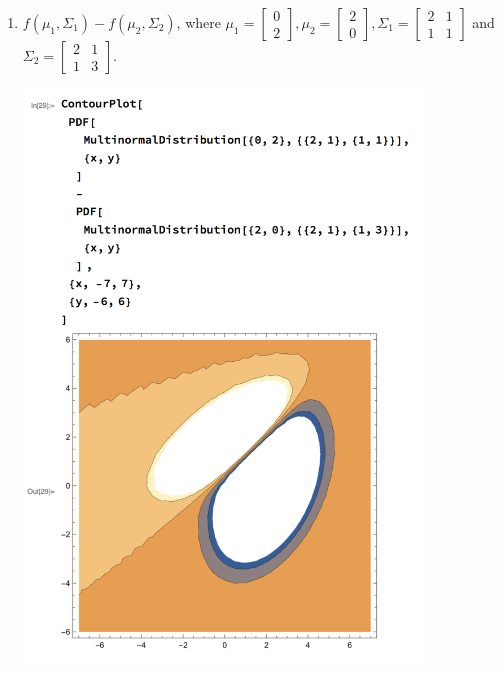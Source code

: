 \documentclass{article}
\begin{document}
\begin{enumerate}[label=(\alph*)]
    \newpage
    \item $f(\mu_1, \Sigma_1) - f(\mu_2, \Sigma_2)$, where $\mu_1 = \begin{bmatrix} 0 \\ 2 \end{bmatrix}, \mu_2 = \begin{bmatrix} 2 \\ 0 \end{bmatrix}, \Sigma_1 = \begin{bmatrix} 2 & 1 \\ 1 & 1 \end{bmatrix}$ and $\Sigma_2 = \begin{bmatrix} 2 & 1 \\ 1 & 3 \end{bmatrix}$.
    \begin{mdframed}
      \includegraphics[width=300pt]{img/hw03_2d.png}
    \end{mdframed}


\end{enumerate}
\end{document}
